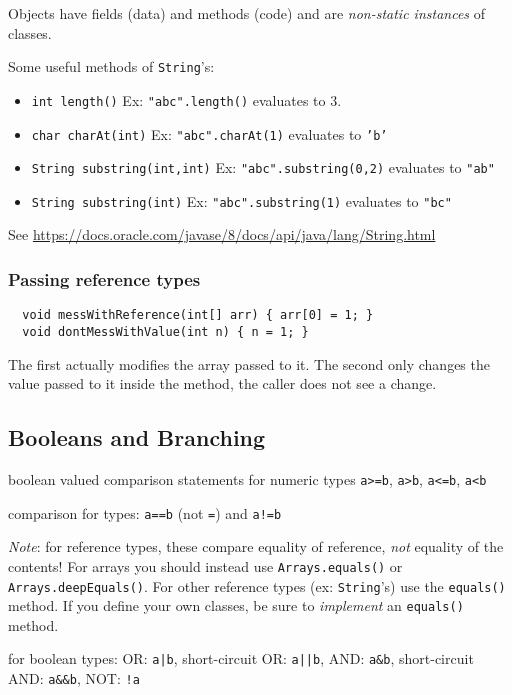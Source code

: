 \documentclass[11pt,letterpaper]{amsart}
\begin{document}
Objects have fields (data) and methods (code) and are {\em non-static
  instances} of classes.

Some useful methods of \texttt{String}'s:
\begin{itemize}
\item \texttt{int length()} Ex: \texttt{"abc".length()} evaluates to 3.
\item \texttt{char charAt(int)} Ex: \texttt{"abc".charAt(1)} evaluates
  to \texttt{'b'}
\item \texttt{String substring(int,int)} Ex:
  \texttt{"abc".substring(0,2)} evaluates to \texttt{"ab"}
\item \texttt{String substring(int)} Ex:
  \texttt{"abc".substring(1)} evaluates to \texttt{"bc"}
\end{itemize}
See
\url{https://docs.oracle.com/javase/8/docs/api/java/lang/String.html}

\subsubsection{Passing reference types}

\begin{verbatim}
  void messWithReference(int[] arr) { arr[0] = 1; }
  void dontMessWithValue(int n) { n = 1; }
\end{verbatim}

The first actually modifies the array passed to it. The second only
changes the value passed to it inside the method, the caller does not
see a change.

\subsection{Booleans and Branching}

boolean valued comparison statements for numeric types \texttt{a>=b},
\texttt{a>b}, \texttt{a<=b}, \texttt{a<b}

comparison for types: \texttt{a==b} (not \texttt{=}) and \texttt{a!=b}

\emph{Note}: for reference types, these compare equality of reference,
{\em not} equality of the contents! For arrays you should instead use
\texttt{Arrays.equals()} or \texttt{Arrays.deepEquals()}. For other
reference types (ex: \texttt{String}'s) use the \texttt{equals()}
method. If you define your own classes, be sure to \emph{implement} an
\texttt{equals()} method.

for boolean types: OR: \texttt{a|b}, short-circuit OR: \texttt{a||b},
AND: \texttt{a\&b}, short-circuit AND: \texttt{a\&\&b}, NOT:
\texttt{!a}
\end{document}
